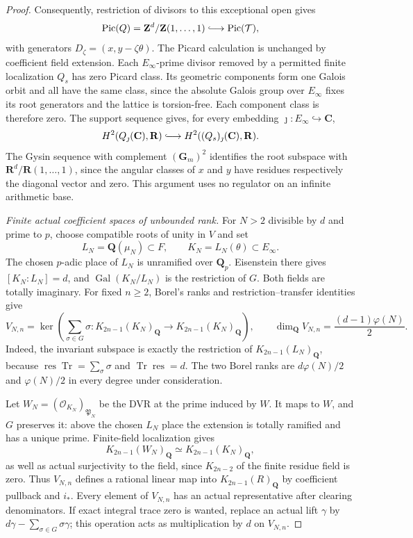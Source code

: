 \documentclass[11pt,a4paper]{amsart}
\numberwithin{equation}{section}
\theoremstyle{definition}
\theoremstyle{remark}
\newcommand{\Q}{\mathbf Q}
\newcommand{\Z}{\mathbf Z}
\newcommand{\R}{\mathbf R}
\newcommand{\C}{\mathbf C}
\newcommand{\Pic}{\operatorname{Pic}}
\begin{document}
\begin{proof}
Consequently, restriction of divisors to this exceptional open
gives
\[
 \Pic(Q)=\Z^d/\Z(1,\ldots,1)
       \lhook\joinrel\longrightarrow\Pic(\mathcal T),
\]
with generators $D_\zeta=(x,y-\zeta\theta)$.
The Picard calculation is unchanged by coefficient field
extension. Each $E_\infty$-prime divisor removed by a permitted
finite localization $Q_s$ has zero Picard class. Its geometric
components form one Galois orbit and all have the same class,
since the absolute Galois group over $E_\infty$ fixes its root
generators and the lattice is
torsion-free. Each component class is therefore zero.
The support sequence gives, for every embedding
$\jmath:E_\infty\hookrightarrow\C$,
\begin{equation}
 H^2(Q_\jmath(\C),\R)
      \lhook\joinrel\longrightarrow H^2((Q_s)_\jmath(\C),\R).
 \label{d2ext:strictcoefficientbetti}
\end{equation}
The Gysin sequence with complement $(\mathbf G_m)^2$ identifies
the root subspace with $\R^d/\R(1,\ldots,1)$, since the
angular classes of $x$ and $y$ have residues respectively the
diagonal vector and zero. This argument uses no regulator on
an infinite arithmetic base.

\emph{Finite actual coefficient spaces of unbounded rank.}
For $N>2$ divisible by $d$ and prime to $p$, choose compatible
roots of unity in $V$ and set
\[
 L_N=\Q(\mu_N)\subset F,\qquad K_N=L_N(\theta)\subset E_\infty .
\]
The chosen $p$-adic place of $L_N$ is unramified over $\Q_p$.
Eisenstein there gives $[K_N:L_N]=d$, and
$\operatorname{Gal}(K_N/L_N)$ is the restriction of $G$. Both fields
are totally imaginary. For fixed $n\ge2$, Borel's ranks
\cite[Proposition~12.2]{Borel} and restriction--transfer identities give
\begin{equation}
 V_{N,n}=
 \ker\!\left(\sum_{\sigma\in G}\sigma:
       K_{2n-1}(K_N)_{\Q}\to K_{2n-1}(K_N)_{\Q}\right),
 \qquad
 \dim_{\Q}V_{N,n}=\frac{(d-1)\varphi(N)}2.
 \label{d2ext:strictcoefficientrank}
\end{equation}
Indeed, the invariant subspace is exactly the restriction of
$K_{2n-1}(L_N)_{\Q}$, because
$\operatorname{res}\operatorname{Tr}=\sum_\sigma\sigma$ and
$\operatorname{Tr}\operatorname{res}=d$.
The two Borel ranks are $d\varphi(N)/2$ and $\varphi(N)/2$
in every degree under consideration.

Let $W_N=(\mathcal O_{K_N})_{\mathfrak P_N}$ be the DVR
at the prime induced by $W$. It maps to $W$, and $G$ preserves
it: above the chosen $L_N$ place the extension is totally
ramified and has a unique prime. Finite-field localization
gives
\[
 K_{2n-1}(W_N)_{\Q}\simeq K_{2n-1}(K_N)_{\Q},
\]
as well as actual surjectivity to the field, since
$K_{2n-2}$ of the finite residue field is zero.
Thus $V_{N,n}$ defines a rational linear map into
$K_{2n-1}(R)_{\Q}$ by coefficient pullback and $i_*$.
Every element of $V_{N,n}$ has an actual representative after clearing
denominators. If exact integral trace zero is wanted, replace
an actual lift $\gamma$ by
$d\gamma-\sum_{\sigma\in G}\sigma\gamma$; this operation
acts as multiplication by $d$ on $V_{N,n}$.


\end{proof}
\end{document}
